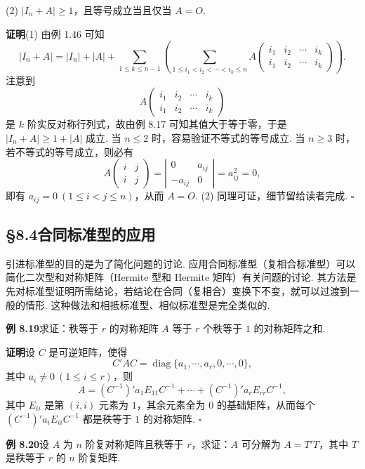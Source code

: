 \documentclass[UTF8, 12pt, fontset=fandol, oneside]{ctexart}
\begin{document}
(2) $|I_n+A|\ge 1$，且等号成立当且仅当 $A=O$.

\noindent\textbf{证明}\quad (1) 由例 1.46 可知
\[
|I_n+A|=|I_n|+|A|+\sum_{1\le k\le n-1}\left(\sum_{1\le i_1<i_2<\cdots<i_k\le n}
A\left(\begin{array}{cccc}
i_1 & i_2 & \cdots & i_k\\
i_1 & i_2 & \cdots & i_k
\end{array}\right)\right).
\]
注意到
\[
A\left(\begin{array}{cccc}
i_1 & i_2 & \cdots & i_k\\
i_1 & i_2 & \cdots & i_k
\end{array}\right)
\]
是 $k$ 阶实反对称行列式，故由例 8.17 可知其值大于等于零，于是 $|I_n+A|\ge 1+|A|$ 成立. 当 $n\le 2$ 时，容易验证不等式的等号成立. 当 $n\ge 3$ 时，若不等式的等号成立，则必有
\[
A\left(\begin{array}{cc}
i & j\\
i & j
\end{array}\right)
=
\left|\begin{array}{cc}
0 & a_{ij}\\
-a_{ij} & 0
\end{array}\right|=a_{ij}^2=0,
\]
即有 $a_{ij}=0\ (1\le i<j\le n)$，从而 $A=O$. (2) 同理可证，细节留给读者完成. $\ensuremath{\square}$

\subsection*{§8.4\quad 合同标准型的应用}

引进标准型的目的是为了简化问题的讨论. 应用合同标准型（复相合标准型）可以简化二次型和对称矩阵（Hermite 型和 Hermite 矩阵）有关问题的讨论. 其方法是先对标准型证明所需结论，若结论在合同（复相合）变换下不变，就可以过渡到一般的情形. 这种做法和相抵标准型、相似标准型是完全类似的.

\noindent\textbf{例 8.19}\quad 求证：秩等于 $r$ 的对称矩阵 $A$ 等于 $r$ 个秩等于 $1$ 的对称矩阵之和.

\noindent\textbf{证明}\quad 设 $C$ 是可逆矩阵，使得
\[
C'AC=\operatorname{diag}\{a_1,\cdots,a_r,0,\cdots,0\},
\]
其中 $a_i\ne 0\ (1\le i\le r)$，则
\[
A=(C^{-1})'a_1E_{11}C^{-1}+\cdots+(C^{-1})'a_rE_{rr}C^{-1},
\]
其中 $E_{ii}$ 是第 $(i,i)$ 元素为 $1$，其余元素全为 $0$ 的基础矩阵，从而每个 $(C^{-1})'a_iE_{ii}C^{-1}$ 都是秩等于 $1$ 的对称矩阵. $\ensuremath{\square}$

\noindent\textbf{例 8.20}\quad 设 $A$ 为 $n$ 阶复对称矩阵且秩等于 $r$，求证：$A$ 可分解为 $A=T'T$，其中 $T$ 是秩等于 $r$ 的 $n$ 阶复矩阵.
\end{document}
